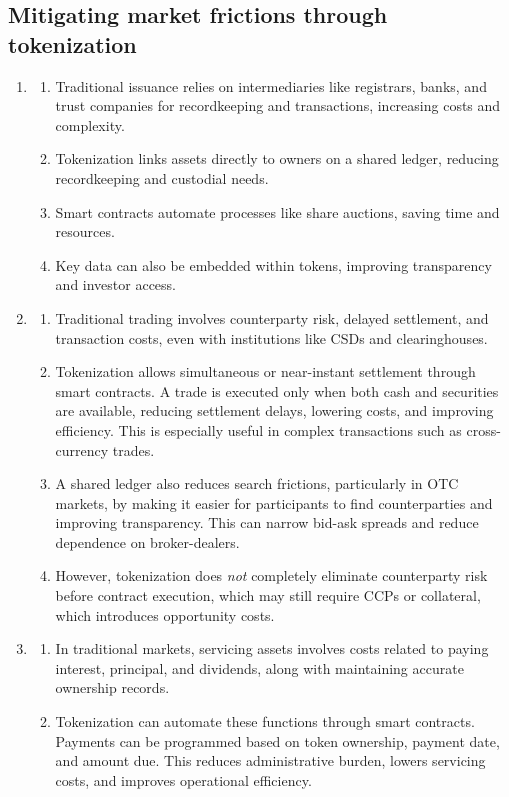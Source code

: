 \subsection*{Mitigating market frictions through tokenization}

\begin{enumerate}
\item {}
  \begin{enumerate}[label=\alph*)]
  \item Traditional issuance relies on intermediaries like registrars, banks, and trust
  companies for recordkeeping and transactions, increasing costs and complexity.
  \item Tokenization links assets directly to owners on a shared ledger, reducing
  recordkeeping and custodial needs.
  \item Smart contracts automate processes like share auctions, saving time and resources.
  \item Key data can also be embedded within tokens, improving transparency and investor
  access.
  \end{enumerate}
\item {}
  \begin{enumerate}[label=\alph*)]
  \item Traditional trading involves counterparty risk, delayed settlement, and transaction
  costs, even with institutions like CSDs and clearinghouses.
  \item Tokenization allows simultaneous or near-instant settlement through smart contracts. A
  trade is executed only when both cash and securities are available, reducing settlement
  delays, lowering costs, and improving efficiency. This is especially useful in complex
  transactions such as cross-currency trades.
  \item A shared ledger also reduces search frictions, particularly in OTC markets, by making
  it easier for participants to find counterparties and improving transparency. This can narrow
  bid-ask spreads and reduce dependence on broker-dealers.
  \item However, tokenization does \emph{not} completely eliminate counterparty risk before
  contract execution, which may still require CCPs or collateral, which introduces opportunity
  costs.
  \end{enumerate}
\item {}
  \begin{enumerate}[label=\alph*)]
  \item In traditional markets, servicing assets involves costs related to paying interest,
  principal, and dividends, along with maintaining accurate ownership records.
  \item Tokenization can automate these functions through smart contracts. Payments can be
  programmed based on token ownership, payment date, and amount due. This reduces
  administrative burden, lowers servicing costs, and improves operational efficiency.
  \end{enumerate}
\end{enumerate}

